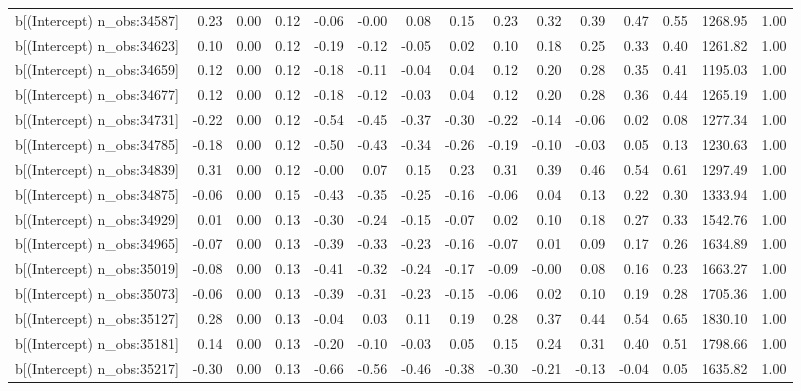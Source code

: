 \begin{table}[ht]
\begin{tabular}{rrrrrrrrrrrrrrr}
  b[(Intercept) n\_obs:34587] & 0.23 & 0.00 & 0.12 & -0.06 & -0.00 & 0.08 & 0.15 & 0.23 & 0.32 & 0.39 & 0.47 & 0.55 & 1268.95 & 1.00 \\ 
  b[(Intercept) n\_obs:34623] & 0.10 & 0.00 & 0.12 & -0.19 & -0.12 & -0.05 & 0.02 & 0.10 & 0.18 & 0.25 & 0.33 & 0.40 & 1261.82 & 1.00 \\ 
  b[(Intercept) n\_obs:34659] & 0.12 & 0.00 & 0.12 & -0.18 & -0.11 & -0.04 & 0.04 & 0.12 & 0.20 & 0.28 & 0.35 & 0.41 & 1195.03 & 1.00 \\ 
  b[(Intercept) n\_obs:34677] & 0.12 & 0.00 & 0.12 & -0.18 & -0.12 & -0.03 & 0.04 & 0.12 & 0.20 & 0.28 & 0.36 & 0.44 & 1265.19 & 1.00 \\ 
  b[(Intercept) n\_obs:34731] & -0.22 & 0.00 & 0.12 & -0.54 & -0.45 & -0.37 & -0.30 & -0.22 & -0.14 & -0.06 & 0.02 & 0.08 & 1277.34 & 1.00 \\ 
  b[(Intercept) n\_obs:34785] & -0.18 & 0.00 & 0.12 & -0.50 & -0.43 & -0.34 & -0.26 & -0.19 & -0.10 & -0.03 & 0.05 & 0.13 & 1230.63 & 1.00 \\ 
  b[(Intercept) n\_obs:34839] & 0.31 & 0.00 & 0.12 & -0.00 & 0.07 & 0.15 & 0.23 & 0.31 & 0.39 & 0.46 & 0.54 & 0.61 & 1297.49 & 1.00 \\ 
  b[(Intercept) n\_obs:34875] & -0.06 & 0.00 & 0.15 & -0.43 & -0.35 & -0.25 & -0.16 & -0.06 & 0.04 & 0.13 & 0.22 & 0.30 & 1333.94 & 1.00 \\ 
  b[(Intercept) n\_obs:34929] & 0.01 & 0.00 & 0.13 & -0.30 & -0.24 & -0.15 & -0.07 & 0.02 & 0.10 & 0.18 & 0.27 & 0.33 & 1542.76 & 1.00 \\ 
  b[(Intercept) n\_obs:34965] & -0.07 & 0.00 & 0.13 & -0.39 & -0.33 & -0.23 & -0.16 & -0.07 & 0.01 & 0.09 & 0.17 & 0.26 & 1634.89 & 1.00 \\ 
  b[(Intercept) n\_obs:35019] & -0.08 & 0.00 & 0.13 & -0.41 & -0.32 & -0.24 & -0.17 & -0.09 & -0.00 & 0.08 & 0.16 & 0.23 & 1663.27 & 1.00 \\ 
  b[(Intercept) n\_obs:35073] & -0.06 & 0.00 & 0.13 & -0.39 & -0.31 & -0.23 & -0.15 & -0.06 & 0.02 & 0.10 & 0.19 & 0.28 & 1705.36 & 1.00 \\ 
  b[(Intercept) n\_obs:35127] & 0.28 & 0.00 & 0.13 & -0.04 & 0.03 & 0.11 & 0.19 & 0.28 & 0.37 & 0.44 & 0.54 & 0.65 & 1830.10 & 1.00 \\ 
  b[(Intercept) n\_obs:35181] & 0.14 & 0.00 & 0.13 & -0.20 & -0.10 & -0.03 & 0.05 & 0.15 & 0.24 & 0.31 & 0.40 & 0.51 & 1798.66 & 1.00 \\ 
  b[(Intercept) n\_obs:35217] & -0.30 & 0.00 & 0.13 & -0.66 & -0.56 & -0.46 & -0.38 & -0.30 & -0.21 & -0.13 & -0.04 & 0.05 & 1635.82 & 1.00 \\ 

\end{tabular}
\end{table}
